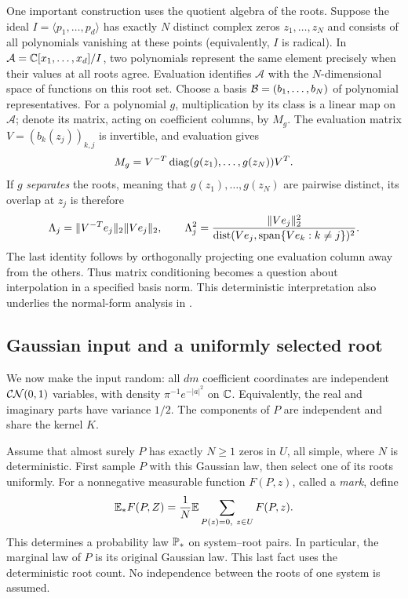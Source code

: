 One important construction uses the quotient algebra of the roots. Suppose
the ideal $I=\langle p_1,\ldots,p_d\rangle$ has exactly $N$ distinct complex
zeros $z_1,\ldots,z_N$ and consists of all polynomials vanishing at these
points (equivalently, $I$ is radical). In
$\mathcal A=\mathbb C[x_1,\ldots,x_d]/I$, two polynomials represent the same element
precisely when their values at all roots agree. Evaluation identifies
$\mathcal A$ with the $N$-dimensional space of functions on this root set.
Choose a basis $\mathcal B=(b_1,\ldots,b_N)$ of polynomial representatives.
For a polynomial $g$, multiplication by its class is a linear map on
$\mathcal A$; denote its matrix, acting on coefficient columns, by $M_g$.
The evaluation matrix $V=(b_k(z_j))_{k,j}$ is invertible, and evaluation gives
\[
 M_g=V^{-T}\operatorname{diag}(g(z_1),\ldots,g(z_N))V^T.
\]
If $g$ \emph{separates} the roots, meaning that $g(z_1),\ldots,g(z_N)$ are
pairwise distinct, its overlap at $z_j$ is therefore
\begin{equation}\label{eq:setup-interpolation}
 \Lambda_j=\|V^{-T}e_j\|_2\|Ve_j\|_2,
 \qquad
 \Lambda_j^2=
 \frac{\|Ve_j\|_2^2}
 {\operatorname{dist}(Ve_j,\operatorname{span}\{Ve_k:k\ne j\})^2}.
\end{equation}
The last identity follows by orthogonally projecting one evaluation column
away from the others. Thus matrix conditioning becomes a question about
interpolation in a specified basis norm. This deterministic interpretation
also underlies the normal-form analysis in \cite{graf2026numerical}.

\subsection{Gaussian input and a uniformly selected root}\label{sec:setup-probability}

We now make the input random: all $dm$ coefficient coordinates are independent
$\mathcal{CN}(0,1)$ variables, with density $\pi^{-1}e^{-|a|^2}$ on $\mathbb C$.
Equivalently, the real and imaginary parts have variance $1/2$.
The components of $P$ are independent and share the kernel $K$.

Assume that almost surely $P$ has exactly $N\ge1$ zeros in $U$, all simple,
where $N$ is deterministic. First sample $P$ with this Gaussian law, then select
one of its roots uniformly. For a nonnegative measurable function $F(P,z)$,
called a \emph{mark}, define
\begin{equation}\label{eq:setup-selected-root}
 \mathbb E_* F(P,Z)=\frac1N\mathbb E\sum_{P(z)=0,\ z\in U}F(P,z).
\end{equation}
This determines a probability law $\mathbb P_*$ on system--root pairs. In particular,
the marginal law of $P$ is its original Gaussian law. This last fact uses the
deterministic root count. No independence between the roots of one system is
assumed.

